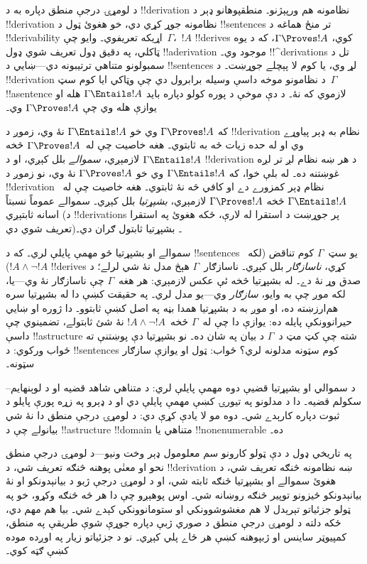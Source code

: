 \documentclass[../../../include/open-logic-section]{subfiles}
\begin{document}


د لومړۍ درجې منطق دپاره به د !!{derivation} نظامونه هم ورپېژنو۔
منطقپوهانو ډېر د !!{derivation} نظامونه جوړ کړي دي، خو هغوئ ټول د
!!{sentence}s تر منځ هماغه د !!{derivability} اړيکه تعريفوي۔ وايو
چې~$\Gamma$،~$!A$ !!{derive}s کوي، $\Gamma \Proves !A$، که د يوه
ټاکلي، په دقيق ډول تعريف شوي ډول !!a{derivation} موجود وي۔
!!^{derivation}s تل د سمبولونو متناهي ترتيبونه دي---ښايي د
!!{sentence}s لړ وي، يا کوم لا پېچلے جوړښت۔ د !!{derivation} د
نظامونو موخه داسې وسيله برابرول دي چې وټاکي ايا کوم سټ~$\Gamma$
!!a{sentence} لازموي که نۀ۔ د دې موخې د پوره کولو دپاره بايد
$\Gamma \Entails !A$ هله او يوازې هله وي چې $\Gamma \Proves !A$
وي۔

که $\Gamma \Proves !A$ وي خو $\Gamma \Entails !A$ نۀ وي، زموږ د
!!{derivation} نظام به ډېر پياوړے وي او له حده زيات څه به ثابتوي۔
هغه خاصيت چې له~$\Gamma \Proves !A$ څخه $\Gamma \Entails !A$
لازمېږي، \emph{سموالے} بلل کېږي، او د !!{derivation} د هر ښه نظام
لږ تر لږه غوښتنه ده۔ له بلې خوا، که $\Gamma \Entails !A$ وي خو
$\Gamma \Proves !A$ نۀ وي، نو زموږ د !!{derivation} نظام ډېر کمزورے
دے او کافي څه نۀ ثابتوي۔ هغه خاصيت چې له~$\Gamma \Entails !A$ څخه
$\Gamma \Proves !A$ لازمېږي، \emph{بشپړتيا} بلل کېږي۔ سموالے
عموماً نسبتاً اسانه ثابتېږي (د !!{derivation}s پر جوړښت د استقرا له
لارې، ځکه هغوئ په استقرا تعريف شوي دي)۔ بشپړتيا ثابتول ګران دي۔

سموالے او بشپړتيا څو مهمې پايلې لري۔ که د !!{sentence}s يو
سټ~$\Gamma$ کوم تناقض (لکه~$!A \land \lnot !A$) !!{derive}s کړي،
\emph{ناسازګار} بلل کېږي۔ ناسازګار~$\Gamma$ هېڅ مدل نۀ شي لرلے؛ د
صدق وړ نۀ دے۔ له بشپړتيا څخه ئې عکس لازمېږي: هر هغه~$\Gamma$ چې
ناسازګار نۀ وي---يا، لکه موږ چې به وايو، \emph{سازګار} وي---يو مدل
لري۔ په حقيقت کښې دا له بشپړتيا سره هم‌ارزښته ده، او موږ به د
بشپړتيا همدا بڼه په اصل کښې ثابتوو۔ دا ژوره او ښايي حيرانوونکې
پايله ده: يوازې دا چې له~$\Gamma$ څخه~$!A \land \lnot !A$ نۀ شئ
ثابتولے، تضمينوي چې داسې !!a{structure} شته چې کټ مټ د~$\Gamma$ د
بيان په شان ده۔ نو بشپړتيا دې پوښتنې ته ځواب ورکوي: د
!!{sentence}s کوم سټونه مدلونه لري؟ ځواب: ټول او يوازې سازګار
سټونه۔

د سموالي او بشپړتيا قضيې دوه مهمې پايلې لري: د متناهي شاهد قضيه او
د لوېنهايم--سکولم قضيه۔ دا د مدلونو په تيورۍ کښې مهمې پايلې دي
او د ډېرو په زړه پورې پايلو د ثبوت دپاره کارېدے شي۔ دوه مو لا يادې
کړې دي: د لومړۍ درجې منطق دا نۀ شي بيانولے چې د !!a{structure}
!!{domain} متناهي يا !!{nonenumerable} ده۔

په تاريخي ډول د دې ټولو کارونو سم معلومول ډېر وخت ونيو---د لومړۍ
درجې منطق نحو او معنٰی پوهنه څنګه تعريف شي، د !!{derivation} ښه
نظامونه څنګه تعريف شي، د هغوئ سموالے او بشپړتيا څنګه ثابته شي، او
د لومړۍ درجې ژبو د بيانېدونکو او نۀ بيانېدونکو څيزونو توپير څنګه
روښانه شي۔ اوس پوهېږو چې دا هر څه څنګه وکړو، خو په ټولو جزئياتو
تېرېدل لا هم مغشوشوونکي او ستومانوونکي کېدے شي۔ بيا هم مهم دي، ځکه
دلته د لومړۍ درجې منطق د صوري ژبې دپاره جوړې شوې طريقې په منطق،
کمپيوټر ساينس او ژبپوهنه کښې هر ځاے پلي کېږي۔ نو د جزئياتو زيار په
اوږده موده کښې ګټه کوي۔
\end{document}
